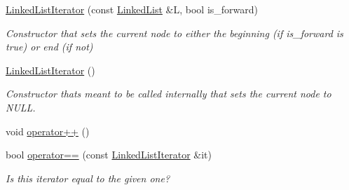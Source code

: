 \begin{DoxyCompactItemize}
\item 
\mbox{\label{classssuds_1_1_linked_list_1_1_linked_list_iterator_aa874f7830899be8293eb66f051f16838}} 
\mbox{\hyperlink{classssuds_1_1_linked_list_1_1_linked_list_iterator_aa874f7830899be8293eb66f051f16838}{Linked\+List\+Iterator}} (const \mbox{\hyperlink{classssuds_1_1_linked_list}{Linked\+List}} \&L, bool is\+\_\+forward)
\begin{DoxyCompactList}\small\item\em Constructor that sets the current node to either the beginning (if is\+\_\+forward is true) or end (if not) \end{DoxyCompactList}\item 
\mbox{\label{classssuds_1_1_linked_list_1_1_linked_list_iterator_a39a715480fe57c342cfc7ed02d49392b}} 
\mbox{\hyperlink{classssuds_1_1_linked_list_1_1_linked_list_iterator_a39a715480fe57c342cfc7ed02d49392b}{Linked\+List\+Iterator}} ()
\begin{DoxyCompactList}\small\item\em Constructor that\textquotesingle{}s meant to be called internally that sets the current node to N\+U\+LL. \end{DoxyCompactList}\item 
void \mbox{\hyperlink{classssuds_1_1_linked_list_1_1_linked_list_iterator_ae4c4442dc4b48e1d8abe8af011edf896}{operator++}} ()
\item 
\mbox{\label{classssuds_1_1_linked_list_1_1_linked_list_iterator_aace5d7173b3337a5b78ea7fa9309b0a0}} 
bool \mbox{\hyperlink{classssuds_1_1_linked_list_1_1_linked_list_iterator_aace5d7173b3337a5b78ea7fa9309b0a0}{operator==}} (const \mbox{\hyperlink{classssuds_1_1_linked_list_1_1_linked_list_iterator}{Linked\+List\+Iterator}} \&it)
\begin{DoxyCompactList}\small\item\em Is this iterator equal to the given one? \end{DoxyCompactList}\item 
\mbox{\label{classssuds_1_1_linked_list_1_1_linked_list_iterator_a0cfd4b59e14a42e601cef60289e885be}} 

\end{DoxyCompactItemize}
